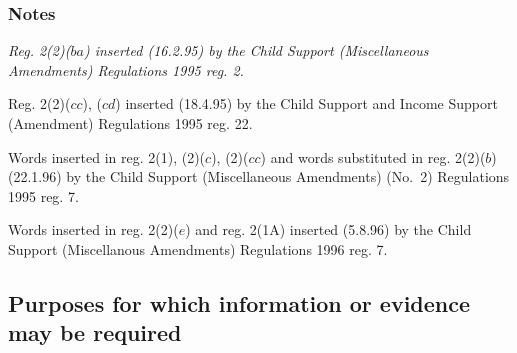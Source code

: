\documentclass[a4paper]{article}
\newcommand\amendment[1]{\subsubsection*{Notes}{\itshape\frenchspacing\footnotesize #1 \par}}
\begin{document}
\amendment{
Reg. 2(2)($ba$) inserted (16.2.95) by the Child Support (Miscellaneous Amendments) Regulations 1995 reg. 2.

Reg. 2(2)($cc$), ($cd$) inserted (18.4.95) by the Child Support and Income Support (Amendment) Regulations 1995 reg. 22.

Words inserted in reg. 2(1), (2)($c$), (2)($cc$) and words substituted in reg. 2(2)($b$) (22.1.96) by the Child Support (Miscellaneous Amendments) (No.\ 2) Regulations 1995 reg. 7.

Words inserted in reg. 2(2)($e$) and reg. 2(1A) inserted (5.8.96) by the Child Support (Miscellanous Amendments) Regulations 1996 reg. 7.
}

\subsection[3. Purposes for which information or evidence may be required]{Purposes for which information or evidence may be required}
\end{document}
